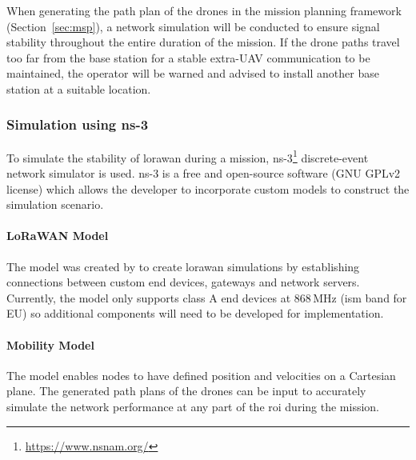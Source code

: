 When generating the path plan of the drones in the mission planning framework (Section~\ref{sec:msp}), a network simulation will be conducted to ensure signal stability throughout the entire duration of the mission. If the drone paths travel too far from the base station for a stable extra-\gls{UAV} communication to be maintained, the operator will be warned and advised to install another base station at a suitable location. 
 
\subsubsection{Simulation using ns-3}

To simulate the stability of \gls{lorawan} during a mission, ns-3\footnote{\url{https://www.nsnam.org/}} discrete-event network simulator is used. ns-3 is a free and open-source software (GNU GPLv2 license) which allows the developer to incorporate custom models to construct the simulation scenario. 

\paragraph{LoRaWAN Model} The model was created by \cite{magrin2017lora} to create \gls{lorawan} simulations by establishing connections between custom end devices, gateways and network servers. Currently, the model only supports class A end devices at 868\,MHz (\gls{ism} band for EU) so additional components will need to be developed for implementation. 

\paragraph{Mobility Model} The model enables nodes to have defined position and velocities on a Cartesian plane. The generated path plans of the drones can be input to accurately simulate the network performance at any part of the \gls{roi} during the mission. 
